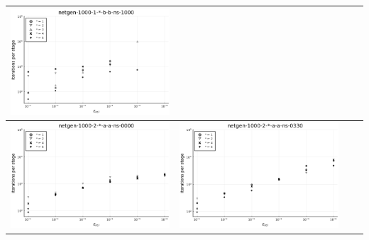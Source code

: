 \documentclass{article}
\begin{document}
\begin{landscape}
\begin{center}
\begin{longtable}{| c | c | c | c |}
\includegraphics[height=0.22\textheight]{itepst_fixlim_netgen-1000-1-_-b-b-ns-1000.png} \\
                \hline
\includegraphics[height=0.22\textheight]{itepst_fixlim_netgen-1000-2-_-a-a-ns-0000.png} &
\includegraphics[height=0.22\textheight]{itepst_fixlim_netgen-1000-2-_-a-a-ns-0330.png} &

\end{longtable}
\end{center}
\end{landscape}
\end{document}
